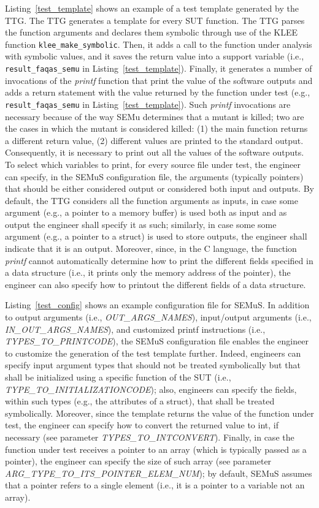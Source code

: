 Listing~\ref{test_template} shows an example of a test template generated by the TTG. The TTG generates a template for every SUT function. The TTG parses the function arguments and declares them symbolic through use of the KLEE function \texttt{klee\_make\_symbolic}. Then, it adds a call to the function under analysis with symbolic values, and it saves the return value into a support variable (i.e., \texttt{result\_faqas\_semu} in Listing~\ref{test_template}). Finally, it generates a number of invocations of the \emph{printf} function that print the value of the software outputs and adds a return statement with the value returned by the function under test (e.g., \texttt{result\_faqas\_semu} in Listing~\ref{test_template}).
Such \emph{printf} invocations are necessary because of the way SEMu determines that a mutant is killed; two are the cases in which the mutant is considered killed: (1) the main function returns a different return value, (2) different values are printed to the standard output. Consequently, it is necessary to print out all the values of the software outputs.
To select which variables to print, for every source file under test, the engineer can specify, in the SEMuS configuration file, the arguments (typically pointers) that should be either considered output or considered both input and outputs. By default, the TTG considers all the function arguments as inputs, in case some argument (e.g., a pointer to a memory buffer) is used both as input and as output the engineer shall specify it as such; similarly, in case some some argument (e.g., a pointer to a struct) is used to store outputs, the engineer shall indicate that it is an output. Moreover, since, in  the C language, the function \emph{printf} cannot automatically determine how to print the different fields specified in a data structure (i.e., it prints only the memory address of the pointer), the engineer can also specify how to printout the different fields of a data structure.

Listing~\ref{test_config} shows an example configuration file for SEMuS. In addition to output arguments (i.e., \emph{OUT\_\-ARGS\_NAMES}), input/output arguments (i.e., \emph{IN\_OUT\_ARGS\_NAMES}), and customized printf instructions (i.e., \emph{TYPES\_TO\_PRINTCODE}), the SEMuS configuration file enables the engineer to customize the generation of the test template further. Indeed, engineers can specify input argument types that should not be treated symbolically but that shall be initialized using a specific function of the SUT (i.e., \emph{TYPE\_TO\_INITIALIZATION\-CODE}); also, engineers can specify the fields, within such types (e.g., the attributes of a struct), that shall be treated symbolically.
Moreover, since the template returns the value of the function under test, the engineer can specify how to convert the returned value to int, if necessary (see parameter \emph{TYPES\_TO\_INTCONVERT}). Finally, in case the function under test receives a pointer to an array (which is typically passed as a pointer), the engineer can specify the size of such array (see parameter \emph{ARG\_TYPE\_TO\_ITS\_POINTER\_ELEM\_NUM}); by default, SEMuS assumes that a pointer refers to a single element (i.e., it is a pointer to a variable not an array).



